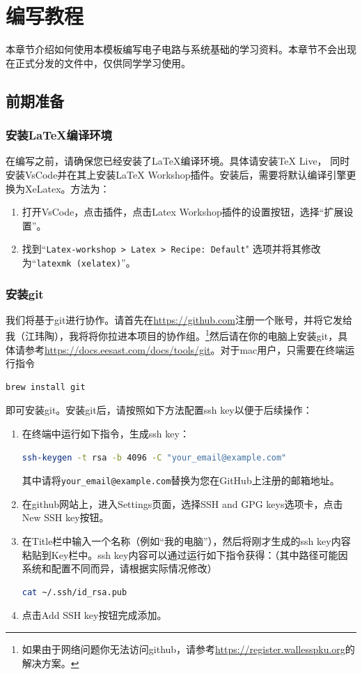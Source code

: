 \section{编写教程}
本章节介绍如何使用本模板编写电子电路与系统基础的学习资料。本章节不会出现在正式分发的文件中，仅供同学学习使用。
\subsection{前期准备}
\subsubsection{安装\LaTeX{}编译环境}
在编写之前，请确保您已经安装了\LaTeX{}编译环境。具体请安装TeX Live， 同时安装VsCode并在其上安装LaTeX Workshop插件。安装后，需要将默认编译引擎更换为XeLatex。方法为：
\begin{enumerate}
  \item 打开VsCode，点击插件，点击Latex Workshop插件的设置按钮，选择“扩展设置”。
    \item 找到“{\tt Latex-workshop > Latex > Recipe: Default}" 选项并将其修改为“{\tt latexmk (xelatex)}”。
\end{enumerate}
\subsubsection{安装git}
我们将基于git进行协作。请首先在\url{https://github.com}注册一个账号，并将它发给我（江玮陶），我将将你拉进本项目的协作组。\footnote{如果由于网络问题你无法访问github，请参考\url{https://register.wallesspku.org}的解决方案。}然后请在你的电脑上安装git，具体请参考\url{https://docs.eesast.com/docs/tools/git}。对于mac用户，只需要在终端运行指令
\begin{lstlisting}[language=bash]
brew install git
\end{lstlisting}
即可安装git。安装git后，请按照如下方法配置ssh key以便于后续操作：
\begin{enumerate}
  \item 在终端中运行如下指令，生成ssh key：
\begin{lstlisting}[language=bash]
ssh-keygen -t rsa -b 4096 -C "your_email@example.com"
\end{lstlisting}
  其中请将\texttt{your\_email@example.com}替换为您在GitHub上注册的邮箱地址。
    \item 在github网站上，进入Settings页面，选择SSH and GPG keys选项卡，点击New SSH key按钮。
    \item 在Title栏中输入一个名称（例如“我的电脑”），然后将刚才生成的ssh key内容粘贴到Key栏中。ssh key内容可以通过运行如下指令获得：（其中路径可能因系统和配置不同而异，请根据实际情况修改）
\begin{lstlisting}[language=bash]
cat ~/.ssh/id_rsa.pub
\end{lstlisting}
    \item 点击Add SSH key按钮完成添加。
\end{enumerate}

